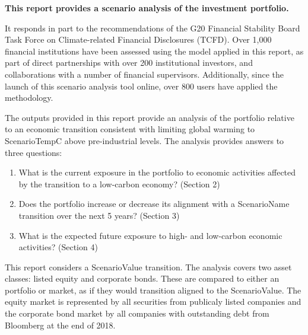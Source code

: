 \documentclass[10pt,table,a4]{article}\usepackage[]{graphicx}\usepackage[]{color}
\begin{document}
	\begin{multicols}{2}
		\textbf{This report provides a scenario analysis of the investment portfolio.} 
		
		It responds in part to the recommendations of the G20 Financial Stability Board Task Force on Climate-related Financial Disclosures (TCFD). Over 1,000 financial institutions have been assessed using the model applied in this report, as part of direct partnerships with over 200 institutional investors, and collaborations with a number of financial supervisors. Additionally, since the launch of this scenario analysis tool online, over 800 users have applied the methodology. 
		
		The outputs provided in this report provide an analysis of the portfolio relative to an economic transition consistent with limiting global warming to ScenarioTemp\degree C above pre-industrial levels. The analysis provides answers to three questions: 
		
		\begin{enumerate}
			\item{What is the current exposure in the portfolio to economic activities affected by the transition to a low-carbon economy? (Section 2)}
			\item{Does the portfolio increase or decrease its alignment with a ScenarioName transition over the next 5 years? (Section 3)}
			\item{What is the expected future exposure to high- and low-carbon economic activities? (Section 4)}
		\end{enumerate}
		
		This report considers a ScenarioValue transition. The analysis covers two asset classes: listed equity and corporate bonds. These are compared to either an portfolio or market, as if they would transition aligned to the ScenarioValue. The equity market is represented by all securities from publicaly listed companies and the corporate bond market by all companies with outstanding debt from Bloomberg at the end of 2018. \columnbreak
		

\end{multicols}
\end{document}
